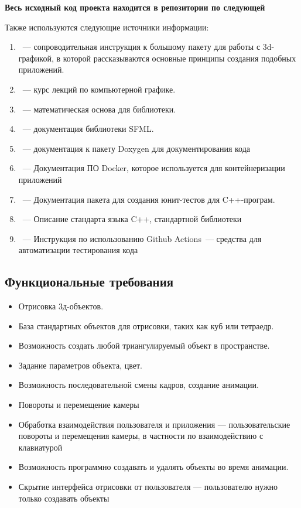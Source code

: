 \documentclass{article}
\begin{document}
\begin{center}\textbf{Весь исходный код проекта находится в репозитории по следующей \href{https://github.com/kik0s/3d-framework}{\color{blue}{ссылке}}} \end{center}

Также используются следующие источники информации:

\begin{enumerate}
\item \cite{vtkBook}~--- сопроводительная инструкция к большому пакету для работы с 3d-графикой, в которой рассказываются основные принципы создания подобных приложений.
\item \cite{urtech}~--- курс лекций по компьютерной графике.
\item \cite{Math3d}~--- математическая основа для библиотеки.
\item \cite{SFML}~--- документация библиотеки SFML.
\item \cite{Doxygen}~--- документация к пакету Doxygen для документирования кода
\item \cite{Docker}~--- Документация ПО Docker, которое используется для контейнеризации приложений 
\item \cite{Cxxtest}~--- Документация пакета для создания юнит-тестов для C++-програм.
\item \cite{CppReference}~--- Описание стандарта языка C++, стандартной библиотеки
\item \cite{Github Actions}~--- Инструкция по использованию Github Actions~--- средства для автоматизации тестирования кода
\end{enumerate}

\subsection{Функциональные требования}

\begin{itemize}
\item Отрисовка 3д-объектов.
\item База стандартных объектов для отрисовки, таких как куб или тетраедр.
\item Возможность создать любой триангулируемый объект в пространстве.
\item Задание параметров объекта, цвет.
\item Возможность последовательной смены кадров, создание анимации.
\item Повороты и перемещение камеры
\item Обработка взаимодействия пользователя и приложения — пользовательские повороты и перемещения камеры, в частности по взаимодействию с клавиатурой
\item Возможность программно создавать и удалять объекты во время анимации.
\item Скрытие интерфейса отрисовки от пользователя — пользователю нужно только создавать объекты
\end{itemize}
\end{document}
